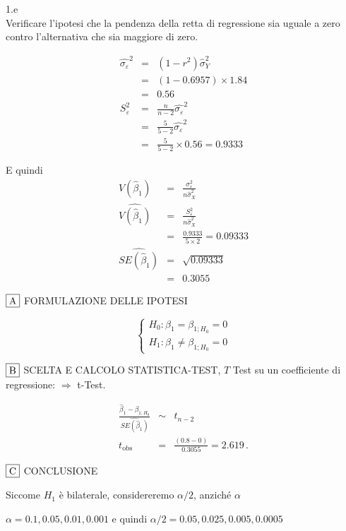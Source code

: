\documentclass[
  11pt,
]{book}
\theoremstyle{mytheoremstyle}
\theoremstyle{mydefstyle}
\newenvironment{sol}
  {
  \begin{tcolorbox}[enhanced,breakable,arc=0.1mm,boxrule=1pt,colback=white,colframe=iblue,
  title=\bf \fontfamily{lmss}\selectfont \hspace{.5 cm} Soluzione,drop fuzzy shadow]

}{
\end{tcolorbox}
  }
\begin{document}
1.e\\
Verificare
l'ipotesi che la pendenza della retta di regressione sia uguale a
zero contro l'alternativa che sia maggiore di zero.

\begin{sol}
\begin{eqnarray*}
\hat{\sigma_\varepsilon}^2&=&(1-r^2)\hat\sigma_Y^2\\
&=& (1- 0.6957 )\times 1.84 \\
   &=&  0.56 \\
   S_\varepsilon^2 &=& \frac{n} {n-2} \hat{\sigma_\varepsilon}^2\\
   &=&  \frac{ 5 } { 5 -2} \hat{\sigma_\varepsilon}^2 \\
 &=&  \frac{ 5 } { 5 -2} \times  0.56  =  0.9333  
\end{eqnarray*}

E quindi\begin{eqnarray*}
V(\hat\beta_{1}) &=& \frac{\sigma_{\varepsilon}^{2}} {n \hat{\sigma}^{2}_{X}} \\
\widehat{V(\hat\beta_{1})} &=& \frac{S_{\varepsilon}^{2}} {n \hat{\sigma}^{2}_{X}} \\
 &=& \frac{ 0.9333 } { 5 \times  2 } =  0.09333 \\
 \widehat{SE(\hat\beta_{1})}        &=&  \sqrt{ 0.09333 }\\
 &=&  0.3055 
\end{eqnarray*}

\(\fbox{A}\) FORMULAZIONE DELLE IPOTESI

\[\begin{cases}
   H_0: \beta_1 = \beta_{1;H_0}=0 \\
   H_1: \beta_1 \neq \beta_{1;H_0}=0 
   \end{cases}\]

\(\fbox{B}\) SCELTA E CALCOLO STATISTICA-TEST, \(T\)
Test su un coefficiente di regressione: \(\Rightarrow\) t-Test.

\begin{eqnarray*}
 \frac{\hat\beta_{ 1 } - \beta_{ 1 ;H_0}} {\widehat{SE(\hat\beta_{ 1 })}}&\sim&t_{n-2}\\
   t_{\text{obs}}
&=& \frac{ ( 0.8 -  0 )} { 0.3055 }
 =   2.619 \, .
\end{eqnarray*}

\(\fbox{C}\) CONCLUSIONE

Siccome \(H_1\) è bilaterale, considereremo \(\alpha/2\),
anziché \(\alpha\)

\(\alpha=0.1, 0.05, 0.01, 0.001\) e quindi \(\alpha/2=0.05, 0.025, 0.005, 0.0005\)


\end{sol}
\end{document}
